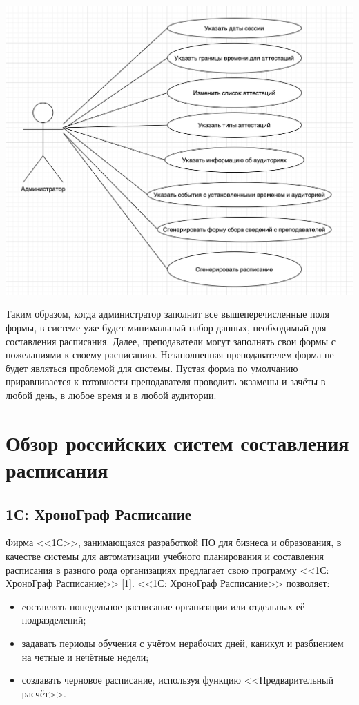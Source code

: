 \begin{minipage}{\textwidth}
	\centering
	\vspace{\mfloatsep} %
	\includegraphics[keepaspectratio=true,scale=0.6] {my_folder/images//usecase2}
	\label{fig:usecse2}  
	\vspace{\mfloatsep} %
\end{minipage}

Таким образом, когда администратор заполнит все вышеперечисленные поля формы, в системе уже будет минимальный набор данных, необходимый для составления расписания. 
Далее, преподаватели могут заполнять свои формы с пожеланиями к своему расписанию. Незаполненная преподавателем форма не будет являться проблемой для системы. Пустая форма по умолчанию приравнивается к готовности преподавателя проводить экзамены и зачёты в любой день, в любое время и в любой аудитории. 

\section{Обзор российских систем составления расписания} \label{ch1:sec2}

\subsection{1С: ХроноГраф Расписание} 
Фирма <<1С>>, занимающаяся разработкой ПО для бизнеса и образования, в качестве системы для автоматизации учебного планирования и составления расписания в разного рода организациях предлагает свою программу <<1С: ХроноГраф Расписание>> [1].
<<1С: ХроноГраф Расписание>> позволяет:
\begin{itemize}
	\item cоставлять понедельное расписание организации или отдельных её подразделений;
	\item задавать периоды обучения с учётом нерабочих дней, каникул и разбиением на четные и нечётные недели;
	\item создавать черновое расписание, используя функцию <<Предварительный расчёт>>.
\end{itemize}

